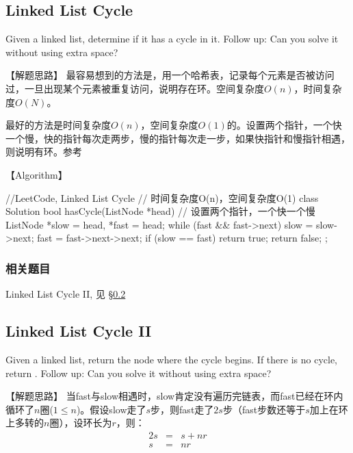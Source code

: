 \subsection{Linked List Cycle}
\label{sec:Linked-List-Cycle}



Given a linked list, determine if it has a cycle in it.
Follow up:
Can you solve it without using extra space?


【解题思路】
最容易想到的方法是，用一个哈希表，记录每个元素是否被访问过，一旦出现某个元素被重复访问，说明存在环。空间复杂度$O(n)$，时间复杂度$O(N)$。

最好的方法是时间复杂度$O(n)$，空间复杂度$O(1)$的。设置两个指针，一个快一个慢，快的指针每次走两步，慢的指针每次走一步，如果快指针和慢指针相遇，则说明有环。参考


【Algorithm】
\begin{Code}
	//LeetCode, Linked List Cycle
	// 时间复杂度O(n)，空间复杂度O(1)
	class Solution {
		bool hasCycle(ListNode *head) {
			// 设置两个指针，一个快一个慢
			ListNode *slow = head, *fast = head;
			while (fast && fast->next) {
				slow = slow->next;
				fast = fast->next->next;
				if (slow == fast) return true;
			}
			return false;
		}
	};
\end{Code}


\subsubsection{相关题目}
\begindot
\item Linked List Cycle II, 见 \S \ref{sec:Linked-List-Cycle-II}
\myenddot


\subsection{Linked List Cycle II}
\label{sec:Linked-List-Cycle-II}


Given a linked list, return the node where the cycle begins. If there is no
cycle, return .
Follow up:
Can you solve it without using extra space?

【解题思路】
当fast与slow相遇时，slow肯定没有遍历完链表，而fast已经在环内循环了$n$圈($1 \leq
n$)。假设slow走了$s$步，则fast走了$2s$步（fast步数还等于$s$加上在环上多转的$n$圈），设环长为$r$，则：
\begin{eqnarray}
	2s &=& s + nr \nonumber \\
	s &=& nr \nonumber
\end{eqnarray}

